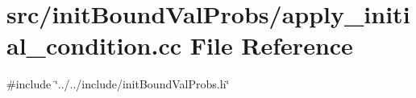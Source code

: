 \section{src/init\+Bound\+Val\+Probs/apply\+\_\+initial\+\_\+condition.cc File Reference}
\label{apply__initial__condition_8cc}
{\ttfamily \#include \char`\"{}../../include/init\+Bound\+Val\+Probs.\+h\char`\"{}}\newline
